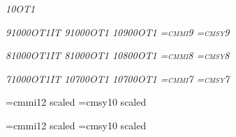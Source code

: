 {{{%
\setfont{}
\setfont{}
\setfont{}\slshape{10}{\magstephalf}{OT1}
\setfont{}
\def\df{\let\ttfont=\deftt \let\bffont = \defbf
\let\slfont=\defsl \let\ttslfont=\defttsl \bf}

\def\smallnominalsize{9pt}
\setfont\smallrm{}
\setfont\smalltt{}
\setfont\smallbf{}
\setfont\smallit\itshape{9}{1000}{OT1IT}
\setfont\smallsl\slshape{9}{1000}{OT1}
\setfont\smallsf{}
\setfont\smallsc\scshape{10}{900}{OT1}
\setfont\smallttsl{}
\font\smalli=cmmi9
\font\smallsy=cmsy9
\def\smallecsize{0900}

\def\smallernominalsize{8pt}
\setfont\smallerrm{}
\setfont\smallertt{}
\setfont\smallerbf{}
\setfont\smallerit\itshape{8}{1000}{OT1IT}
\setfont\smallersl\slshape{8}{1000}{OT1}
\setfont\smallersf{}
\setfont\smallersc\scshape{10}{800}{OT1}
\setfont\smallerttsl{}
\font\smalleri=cmmi8
\font\smallersy=cmsy8
\def\smallerecsize{0800}

\def\sevennominalsize{7pt}
\setfont\sevenrm{}
\setfont\seventt{}
\setfont\sevenbf{}
\setfont\sevenit\itshape{7}{1000}{OT1IT}
\setfont\sevensl\slshape{10}{700}{OT1}
\setfont\sevensf{}
\setfont\sevensc\scshape{10}{700}{OT1}
\setfont\seventtsl{}
\font\seveni=cmmi7
\font\sevensy=cmsy7
\def\sevenecsize{0700}

\def\titlenominalsize{20pt}
\setfont\titlerm{}
\setfont\titleit{}
\setfont\titlesl{}
\setfont\titlett{}
\setfont\titlettsl{}
\setfont\titlesf{}
\let\titlebf=\titlerm
\setfont\titlesc{}
\font\titlei=cmmi12 scaled 
\font\titlesy=cmsy10 scaled 
\def\titleecsize{2074}

\def\chapnominalsize{14pt}
\setfont\chaprm{}
\setfont\chapit{}
\setfont\chapsl{}
\setfont\chaptt{}
\setfont\chapttsl{}
\setfont\chapsf{}
\let\chapbf\chaprm
\setfont\chapsc{}
\font\chapi=cmmi12 scaled 
\font\chapsy=cmsy10 scaled 
\def\chapecsize{1440}

}}}
